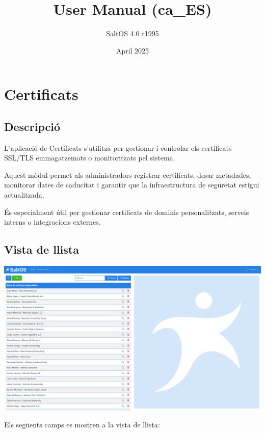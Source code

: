 \documentclass[a4paper]{article}
\title{User Manual (ca\_ES)}
\author{SaltOS 4.0 r1995}
\begin{document}
\date{April 2025}
\maketitle
\clearpage

\tableofcontents
\clearpage


\hypertarget{toc1}{}
\section{Certificats}

\hypertarget{toc2}{}
\subsection{Descripció}

L'aplicació de Certificats s'utilitza per gestionar i controlar els certificats SSL/TLS emmagatzemats o monitoritzats pel sistema.

Aquest mòdul permet als administradors registrar certificats, desar metadades, monitorar dates de caducitat
i garantir que la infraestructura de seguretat estigui actualitzada.

És especialment útil per gestionar certificats de dominis personalitzats, serveis interns o integracions externes.

\hypertarget{toc3}{}
\subsection{Vista de llista}

\begin{center}\includegraphics[width=1\textwidth]{../ujest/snaps/test-screenshots-js-screenshots-certs-certs-list-ca-es-1-snap.png}\end{center}

Els següents camps es mostren a la vista de llista:
\end{document}
